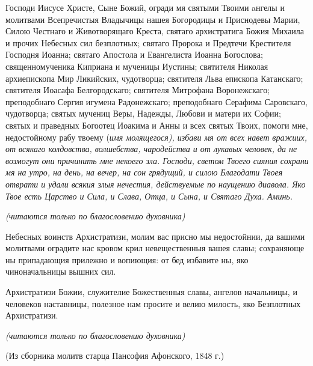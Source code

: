 Господи Иисусе Христе, Сыне Божий, огради мя святыми Твоими aнгелы и молитвами Всепречистыя Владычицы нашея Богородицы и Приснодевы Марии, Силою Честнаго и Животворящаго Креста, святаго архистратига Божия Михаила и прочих Небесных сил безплотных; святаго Пророка и Предтечи Крестителя Господня Иоанна; святаго Апостола и Евангелиста Иоанна Богослова; священномученика Киприана и мученицы Иустины; святителя Николая архиепископа Мир Ликийских, чудотворца; святителя Льва епископа Катанскаго; святителя Иоасафа Белгородскаго; святителя Митрофана Воронежскаго; преподобнаго Сергия игумена Радонежскаго; преподобнаго Серафима Саровскаго,  чудотворца; святых мучениц Веры, Надежды, Любови и матери их Софии; святых и праведных Богоотец Иоакима и Анны и всех святых Твоих, помоги мне, недостойному рабу твоему (\itshape имя молящегося\normalfont{}), избави мя от всех навет вражиих, от всякаго колдовства, волшебства, чародейства и от лукавых человек, да не возмогут они причинить мне некоего зла. Господи, светом Твоего сияния сохрани мя на утро, на день, на вечер, на сон грядущий, и силою Благодати Твоея отврати и удали всякия злыя нечестия, действуемые по наущению диавола. Яко Твое есть Царство и Сила, и Слава, Отца, и Сына, и Святаго Духа. Аминь. 
\mychapterending

 


\itshape (читаются только по благословению духовника)

\normalfont{}



Небесных воинств Архистратизи, молим вас присно мы недостойнии, да вашими молитвами оградите нас кровом крил невещественныя вашея славы; сохраняюще ны припадающия прилежно и вопиющия: от бед избавите ны, яко чиноначальницы вышних сил. 




Архистратизи Божии, служителие Божественныя славы, ангелов начальницы, и человеков наставницы, полезное нам просите и велию милость, яко Безплотных Архистратизи. 
\mychapterending

 


\itshape (читаются только по благословению духовника)

(Из сборника молитв старца Пансофия Афонского, 1848 г.)

